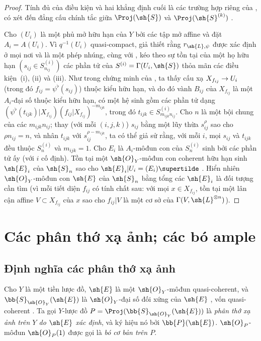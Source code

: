 \documentclass[oneside,10pt]{amsart}
\makeatletter
\newcommand{\ega@arrow}[2]{\mathchoice{#1}{#2}{#2}{#2}}
\renewcommand{\to}{\ega@arrow{\longrightarrow}{\rightarrow}}
\newcommand{\oldpage}[2][]{\marginnote{\normalfont\footnotesize\textbf{#1}~|~#2}\ignorespaces}
\let\EGAOriginalLabel\label
\renewcommand{\label}[1]{\phantomsection\EGAOriginalLabel{#1}}
\makeatother
\begin{document}
\begin{proof}
Tính đủ của điều kiện và hai khẳng định cuối là các trường hợp riêng của , có xét đến đẳng cấu chính tắc giữa $\Proj(\sh{S})$ và $\Proj(\sh{S}^{(k)})$ .

Cho $(U_i)$ là một phủ mở hữu hạn của $Y$ bởi các tập mở affine và đặt $A_i=A(U_i)$.
Vì $q^{-1}(U_i)$ quasi-compact, giả thiết rằng $r_{\sh{L},\psi}$ được xác định ở mọi nơi và là một phép nhúng, cùng với , kéo theo sự tồn tại của một họ hữu hạn $(s_{ij}\in S_{n_{ij}}^{(i)})$ các phần tử của $S^{(i)}=\Gamma(U_i,\sh{S})$ thỏa mãn các điều kiện~(i), (ii) và (iii).
Như trong chứng minh của , ta thấy cấu xạ $X_{f_{ij}}\to U_i$ (trong đó $f_{ij}=\psi^\flat(s_{ij})$) thuộc kiểu hữu hạn, và do đó vành $B_{ij}$ của $X_{f_{ij}}$ là một $A_i$-đại số thuộc kiểu hữu hạn, có một hệ sinh gồm các phần tử dạng $(\psi^\flat(t_{ijk})|X_{f_{ij}})(f_{ij}|X_{f_{ij}})^{-m_{ijk}}$, trong đó $t_{ijk}\in S_{m_{ijk}n_{ij}}^{(i)}$.
Cho $n$ là một bội chung của các $m_{ijk}n_{ij}$;
thay (với mỗi $(i,j,k)$) $s_{ij}$ bằng một lũy thừa $s_{ij}^\rho$ sao cho $\rho n_{ij}=n$, và nhân $t_{ijk}$ với $s_{ij}^{\rho-m_{ijk}}$, ta có thể giả sử rằng, với mỗi $i$, mọi $s_{ij}$ và $t_{ijk}$ đều thuộc $S_n^{(i)}$ và $m_{ijk}=1$.
Cho $E_i$ là $A_i$-môđun con của $S_n^{(i)}$ sinh bởi các phần tử ấy (với $i$ cố định).
Tồn tại một $\sh{O}_Y$-môđun con coherent hữu hạn sinh $\sh{E}_i$ của $\sh{S}_n$ sao cho $\sh{E}_i|U_i=(E_i)\supertilde$ .
\oldpage[II]{71}
Hiển nhiên $\sh{O}_Y$-môđun con $\sh{E}$ của $\sh{S}_n$ bằng tổng các $\sh{E}_i$ là đối tượng cần tìm (vì mỗi tiết diện $f_{ij}$ có tính chất sau: với mọi $x\in X_{f_{ij}}$, tồn tại một lân cận affine $V\subset X_{f_{ij}}$ của $x$ sao cho $f_{ij}|V$ là một cơ sở của $\Gamma(V,\sh{L}^{\otimes n})$).
\end{proof}

\section{Các phân thớ xạ ảnh; các bó ample}
\label{section:II.4}


\subsection{Định nghĩa các phân thớ xạ ảnh}
\label{subsection:II.4.1}

\begin{definition}[4.1.1]
\label{II.4.1.1}
Cho $Y$ là một tiền lược đồ, $\sh{E}$ là một $\sh{O}_Y$-môđun quasi-coherent, và $\bb{S}_{\sh{O}_Y}(\sh{E})$ là $\sh{O}_Y$-đại số đối xứng của $\sh{E}$ , vốn quasi-coherent .
Ta gọi $Y$-lược đồ $P=\Proj(\bb{S}_{\sh{O}_Y}(\sh{E}))$ là \emph{phân thớ xạ ảnh trên $Y$ do $\sh{E}$ xác định}, và ký hiệu nó bởi $\bb{P}(\sh{E})$.
$\sh{O}_P$-môđun $\sh{O}_P(1)$ được gọi là \emph{bó cơ bản trên $P$}.
\end{definition}
\end{document}
